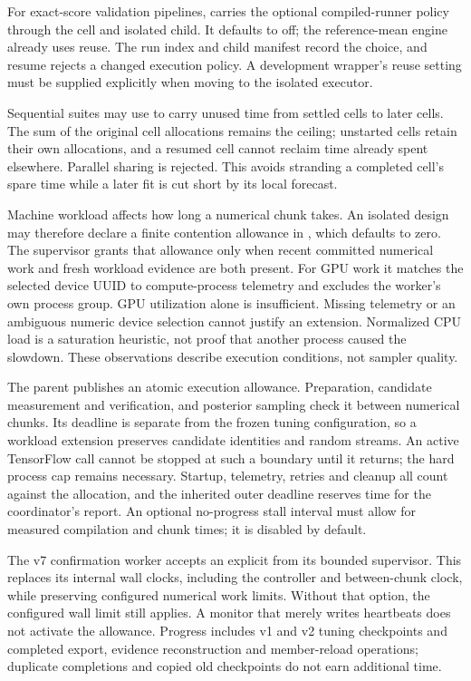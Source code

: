 For exact-score validation pipelines,  carries
the optional compiled-runner policy through the cell and isolated child. It
defaults to off; the reference-mean engine already uses reuse. The run index
and child manifest record the choice, and resume rejects a changed execution
policy. A development wrapper's reuse setting must be supplied explicitly
when moving to the isolated executor.

Sequential suites may use  to carry unused time
from settled cells to later cells. The sum of the original cell allocations
remains the ceiling; unstarted cells retain their own allocations, and a
resumed cell cannot reclaim time already spent elsewhere. Parallel sharing
is rejected. This avoids stranding a completed cell's spare time while a
later fit is cut short by its local forecast.

Machine workload affects how long a numerical chunk takes. An isolated design
may therefore declare a finite contention allowance in
, which defaults to zero.
The supervisor grants that allowance only when recent committed numerical work
and fresh workload evidence are both present. For GPU work it matches the
selected device UUID to compute-process telemetry and excludes the worker's
own process group. GPU utilization alone is insufficient. Missing telemetry or
an ambiguous numeric device selection cannot justify an extension. Normalized
CPU load is a saturation heuristic, not proof that another process caused the
slowdown. These observations describe execution conditions, not sampler quality.

The parent publishes an atomic execution allowance. Preparation, candidate
measurement and verification, and posterior sampling check it between numerical
chunks. Its deadline is separate from the frozen tuning configuration, so a
workload extension preserves candidate identities and random streams. An active
TensorFlow call cannot be stopped at such a boundary until it returns; the hard
process cap remains necessary. Startup, telemetry, retries and cleanup all count
against the allocation, and the inherited outer deadline reserves time for the
coordinator's report. An optional no-progress stall interval must allow for
measured compilation and chunk times; it is disabled by default.

The v7 confirmation worker accepts an explicit  from its
bounded supervisor. This replaces its internal wall clocks, including the
controller and between-chunk clock, while preserving configured numerical work
limits. Without that option, the configured wall limit still applies. A monitor
that merely writes heartbeats does not activate the allowance. Progress includes
v1 and v2 tuning checkpoints and completed export, evidence reconstruction and
member-reload operations; duplicate completions and copied old checkpoints do
not earn additional time.

